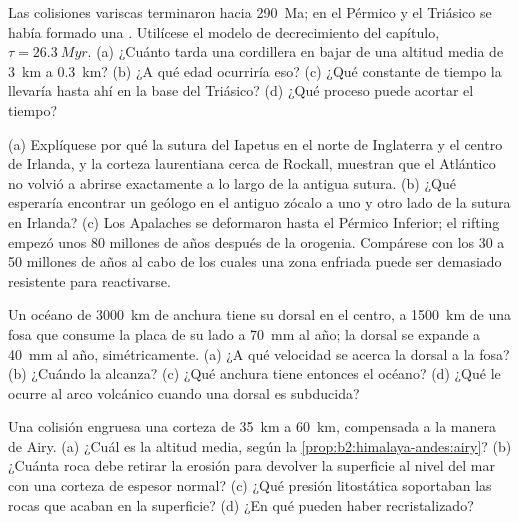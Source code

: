 \begin{exercise}[$\star\star$]\label{exo:b2:wilson-cycle:8}
Las colisiones variscas terminaron hacia \qty{290}{Ma}; en el Pérmico y el Triásico se había formado una .
Utilícese el modelo de decrecimiento del capítulo, $\tau = \qty{26.3}{Myr}$. (a) ¿Cuánto tarda una
cordillera en bajar de una altitud media de \qty{3}{km} a \qty{0.3}{km}? (b) ¿A qué edad ocurriría
eso? (c) ¿Qué constante de tiempo la llevaría hasta ahí en la base del Triásico? (d) ¿Qué
proceso puede acortar el tiempo?
\end{exercise}

\begin{exercise}[$\star\star$]\label{exo:b2:wilson-cycle:9}
(a) Explíquese por qué la sutura del Iapetus en el norte de Inglaterra y el centro de Irlanda, y la corteza
laurentiana cerca de Rockall, muestran que el Atlántico no volvió a abrirse exactamente a lo largo de la antigua sutura.
(b) ¿Qué esperaría encontrar un geólogo en el antiguo zócalo a uno y otro lado de la sutura
en Irlanda? (c) Los Apalaches se deformaron hasta el Pérmico Inferior; el rifting empezó
unos 80 millones de años después de la orogenia. Compárese con los 30 a 50 millones de años al cabo de los cuales
una zona enfriada puede ser demasiado resistente para reactivarse.
\end{exercise}

\begin{exercise}[$\star\star\star$]\label{exo:b2:wilson-cycle:10}
Un océano de \qty{3000}{km} de anchura tiene su dorsal en el centro, a \qty{1500}{km} de una fosa que
consume la placa de su lado a \qty{70}{mm} al año; la dorsal se expande a \qty{40}{mm} al
año, simétricamente. (a) ¿A qué velocidad se acerca la dorsal a la fosa? (b) ¿Cuándo la
alcanza? (c) ¿Qué anchura tiene entonces el océano? (d) ¿Qué le ocurre al arco volcánico cuando una dorsal es
subducida?
\end{exercise}

\begin{exercise}[$\star\star\star$]\label{exo:b2:wilson-cycle:11}
Una colisión engruesa una corteza de \qty{35}{km} a \qty{60}{km}, compensada a la manera de Airy.
(a) ¿Cuál es la altitud media, según la \cref{prop:b2:himalaya-andes:airy}? (b) ¿Cuánta roca debe
retirar la erosión para devolver la superficie al nivel del mar con una corteza de espesor normal?
(c) ¿Qué presión litostática soportaban las rocas que acaban en la superficie? (d) ¿En qué
 pueden haber recristalizado?
\end{exercise}

